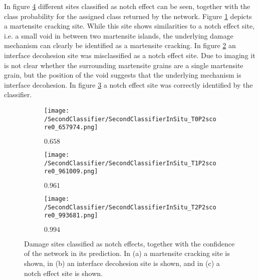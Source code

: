 In figure \ref{fig:InSituNotchEffectSamples} different sites classified as notch effect can be seen, together with the class probability for the assigned class returned by the network. Figure \ref{sub:InSituNotchEffectSamplesM} depicts a martensite cracking site. While this site shows similarities to a notch effect site, i.e. a small void in between two martensite islands, the underlying damage mechanism can clearly be identified as a martensite cracking. In figure \ref{sub:InSituNotchEffectSamplesI} an interface decohesion site was misclassified as a notch effect site. Due to imaging it is not clear whether the surrounding martensite grains are a single martensite grain, but the position of the void suggests that the underlying mechanism is interface decohesion. In figure \ref{sub:InSituNotchEffectSamplesN} a notch effect site was correctly identified by the classifier.

\begin{figure}[H]
\centering
\begin{subfigure}{0.3\textwidth}
\texttt{[image: /SecondClassifier/SecondClassifierInSitu\_T0P2score0\_657974.png]}
\caption{$0.658$}
\label{sub:InSituNotchEffectSamplesM}
\end{subfigure}
\begin{subfigure}{0.3\textwidth}
\texttt{[image: /SecondClassifier/SecondClassifierInSitu\_T1P2score0\_961009.png]}
\caption{$0.961$}
\label{sub:InSituNotchEffectSamplesI}
\end{subfigure}
\begin{subfigure}{0.3\textwidth}
\texttt{[image: /SecondClassifier/SecondClassifierInSitu\_T2P2score0\_993681.png]}
\caption{$0.994$}
\label{sub:InSituNotchEffectSamplesN}
\end{subfigure}
\caption{Damage sites classified as notch effects, together with the confidence of the network in its prediction. In (a) a martensite cracking site is shown, in (b) an interface decohesion site is shown, and in (c) a notch effect site is shown. }
\label{fig:InSituNotchEffectSamples}
\end{figure}

